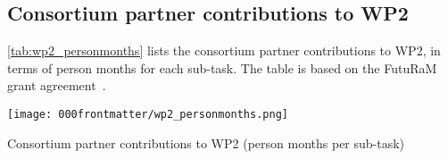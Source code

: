 \begin{landscape}
    \subsection{Consortium partner contributions to WP2}
    \autoref{tab:wp2_personmonths} lists the consortium partner contributions to WP2, in terms of person months for each sub-task. The table is based on the FutuRaM grant agreement~\cite{futuram2022ga}.
    \begin{table}[h!]
        \centering
        \texttt{[image: 000frontmatter/wp2\_personmonths.png]}
        \caption{Consortium partner contributions to WP2 (person months per sub-task)}\label{tab:wp2_personmonths}
    \end{table}
\end{landscape}

\clearpage


